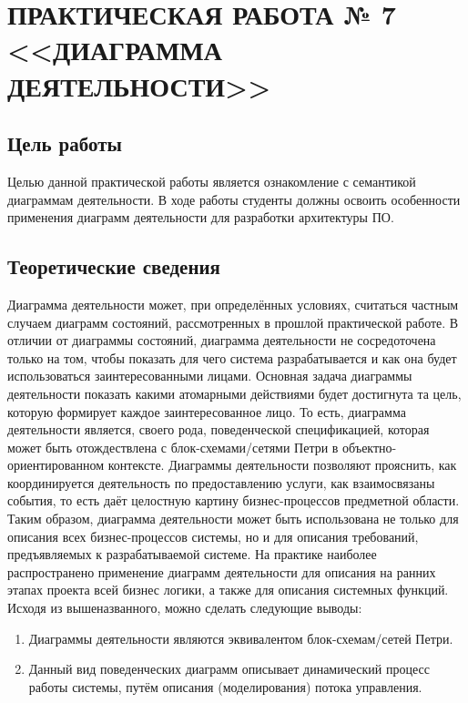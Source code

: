 \chapter{ПРАКТИЧЕСКАЯ РАБОТА № 7 <<ДИАГРАММА ДЕЯТЕЛЬНОСТИ>>}

\section{Цель работы}
Целью данной практической работы является ознакомление с семантикой диаграммам деятельности. В ходе работы студенты должны освоить особенности применения диаграмм деятельности для разработки архитектуры ПО.

\section{Теоретические сведения}

Диаграмма деятельности может, при определённых условиях, считаться частным случаем диаграмм состояний, рассмотренных в прошлой практической работе. В отличии от диаграммы состояний, диаграмма деятельности не сосредоточена только на том, чтобы показать для чего система разрабатывается и как она будет использоваться заинтересованными лицами. Основная задача диаграммы деятельности показать какими атомарными действиями будет достигнута та цель, которую формирует каждое заинтересованное лицо. То есть, диаграмма деятельности является, своего рода, поведенческой спецификацией, которая может быть отождествлена с  блок-схемами/сетями Петри в объектно-ориентированном контексте. Диаграммы деятельности позволяют прояснить, как координируется деятельность по предоставлению услуги, как взаимосвязаны события, то есть даёт целостную картину бизнес-процессов предметной области. Таким образом, диаграмма деятельности может быть использована не только для описания всех бизнес-процессов системы, но и для описания требований, предъявляемых к разрабатываемой системе.
На практике наиболее распространено применение диаграмм деятельности для описания на ранних этапах проекта всей бизнес логики, а также для описания системных функций.
Исходя из вышеназванного, можно сделать следующие выводы:
\begin{enumerate}
	\item{ Диаграммы деятельности являются эквивалентом блок-схемам/сетей Петри.}
	\item{ Данный вид поведенческих диаграмм описывает динамический процесс работы системы, путём описания (моделирования) потока управления.}
\end{enumerate}

